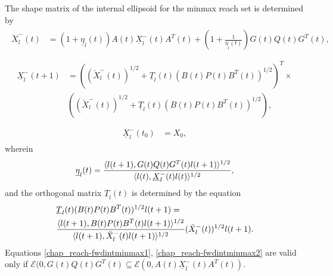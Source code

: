 \documentclass[letterpaper,10pt,english]{sphinxmanual}
\begin{document}
The shape matrix of the internal ellipsoid for the minmax reach set is
determined by
\label{chap_reach:equation-fwdintminmax1}\begin{gather}
\begin{split}\breve{X}^-_l(t) & = (1+\underline{\eta}_l(t))A(t)\underline{X}^-_l(t)A^T(t) +
\left(1+\frac{1}{\underline{\eta}_l(t)}\right)
G(t)Q(t)G^T(t),\\\end{split}\label{chap_reach-fwdintminmax1}
\end{gather}\label{chap_reach:equation-fwdintminmax2}\begin{gather}
\begin{split}\underline{X}^-_l(t+1) & = \left((\breve{X}^-_l(t))^{1/2} +
\underline{T}_l(t)(B(t)P(t)B^T(t))^{1/2}\right)^T
\times \nonumber \\
&\left((\breve{X}^-_l(t))^{1/2} + \underline{T}_l(t)(B(t)P(t)B^T(t))^{1/2}\right),\\\end{split}\label{chap_reach-fwdintminmax2}
\end{gather}\label{chap_reach:equation-fwdintminmax3}\begin{gather}
\begin{split}\underline{X}^-_l(t_0) & = X_0,\end{split}\label{chap_reach-fwdintminmax3}
\end{gather}
wherein
\begin{gather}
\begin{split}\underline{\eta}_l(t) = \frac{\langle l(t+1),
G(t)Q(t)G^T(t)l(t+1)\rangle^{1/2}}{\langle l(t),
\underline{X}^-_l(t)l(t)\rangle^{1/2}},\end{split}\notag
\end{gather}
and the orthogonal matrix \(\underline{T}_l(t)\) is determined by
the equation
\begin{gather}
\begin{split}\begin{aligned}
&\underline{T}_l(t)(B(t)P(t)B^T(t))^{1/2}l(t+1) = \\
& \frac{\langle l(t+1),
B(t)P(t)B^T(t)l(t+1)\rangle^{1/2}}{\langle l(t+1),
\breve{X}^-_l(t)l(t+1)\rangle^{1/2}}(\breve{X}^-_l(t))^{1/2}l(t+1).\end{aligned}\end{split}\notag
\end{gather}
Equations \eqref{chap_reach-fwdintminmax1}, \eqref{chap_reach-fwdintminmax2} are valid only if
\({\mathcal E}(0,G(t)Q(t)G^T(t)\subseteq{\mathcal E}(0,A(t)\underline{X}^-_l(t)A^T(t))\).
\end{document}
